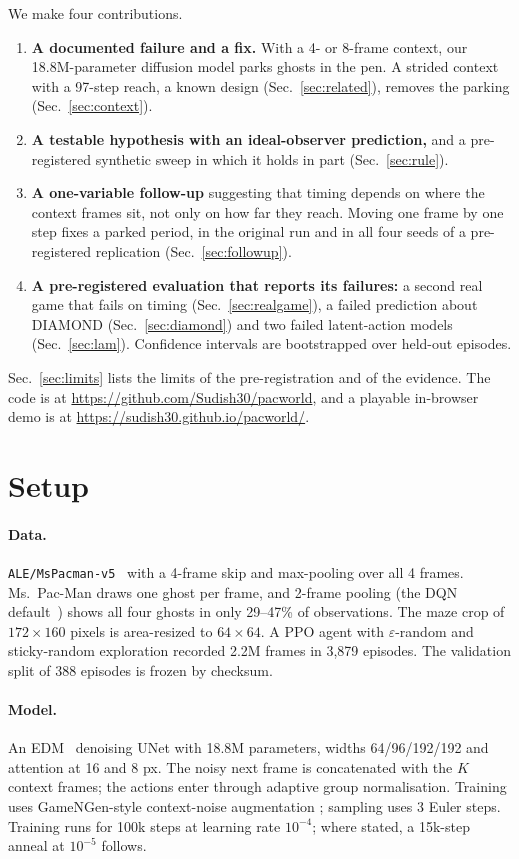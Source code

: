 \documentclass[11pt]{article}
\begin{document}
We make four contributions.
\begin{enumerate}
\item \textbf{A documented failure and a fix.} With a 4- or 8-frame context, our 18.8M-parameter diffusion model
parks ghosts in the pen. A strided context with a 97-step reach, a known design (Sec.~\ref{sec:related}), removes
the parking (Sec.~\ref{sec:context}).
\item \textbf{A testable hypothesis with an ideal-observer prediction,} and a pre-registered synthetic sweep in which
it holds in part (Sec.~\ref{sec:rule}).
\item \textbf{A one-variable follow-up} suggesting that timing depends on where the context frames sit, not only on how
far they reach. Moving one frame by one step fixes a parked period, in the original run and in all four seeds of a
pre-registered replication (Sec.~\ref{sec:followup}).
\item \textbf{A pre-registered evaluation that reports its failures:} a second real game that fails on timing
(Sec.~\ref{sec:realgame}), a failed prediction about DIAMOND (Sec.~\ref{sec:diamond}) and two failed latent-action
models (Sec.~\ref{sec:lam}). Confidence intervals are bootstrapped over held-out episodes.
\end{enumerate}
Sec.~\ref{sec:limits} lists the limits of the pre-registration and of the evidence. The code is at
\url{https://github.com/Sudish30/pacworld}, and a playable in-browser demo is at \url{https://sudish30.github.io/pacworld/}.

\section{Setup}
\label{sec:setup}
\paragraph{Data.} \texttt{ALE/MsPacman-v5}~\cite{bellemare2013ale} with a 4-frame skip and max-pooling over all 4
frames. Ms.~Pac-Man draws one ghost per frame, and 2-frame pooling (the DQN default~\cite{mnih2015dqn}) shows all
four ghosts in only 29--47\% of observations. The maze crop of $172\times160$ pixels is area-resized to
$64\times64$. A PPO agent with $\varepsilon$-random and sticky-random exploration recorded 2.2M frames in 3,879
episodes. The validation split of 388 episodes is frozen by checksum.

\paragraph{Model.} An EDM~\cite{karras2022edm} denoising UNet with 18.8M parameters, widths 64/96/192/192 and
attention at 16 and 8 px. The noisy next frame is concatenated with the $K$ context frames; the actions enter
through adaptive group normalisation. Training uses GameNGen-style context-noise augmentation
\cite{valevski2024gamengen}; sampling uses 3 Euler steps. Training runs for 100k steps at learning rate
$10^{-4}$; where stated, a 15k-step anneal at $10^{-5}$ follows.
\end{document}
